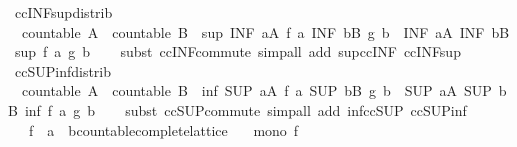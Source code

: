 \begin{isabellebody}
\endisatagproof
{\isafoldproof}%
%
\isadelimproof
\isanewline
%
\endisadelimproof
\isanewline
{}\isamarkupfalse%
\ ccINF{\isacharunderscore}sup{\isacharunderscore}distrib{}{\isacharcolon}\isanewline
\ \ {\isachardoublequoteopen}countable\ A\ {\isasymLongrightarrow}\ countable\ B\ {\isasymLongrightarrow}\ sup\ {\isacharparenleft}INF\ a{\isasymin}A{\isachardot}\ f\ a{\isacharparenright}\ {\isacharparenleft}INF\ b{\isasymin}B{\isachardot}\ g\ b{\isacharparenright}\ {\isacharequal}\ {\isacharparenleft}INF\ a{\isasymin}A{\isachardot}\ INF\ b{\isasymin}B{\isachardot}\ sup\ {\isacharparenleft}f\ a{\isacharparenright}\ {\isacharparenleft}g\ b{\isacharparenright}{\isacharparenright}{\isachardoublequoteclose}\isanewline
%
\isadelimproof
\ \ %
\endisadelimproof
%
\isatagproof
{}\isamarkupfalse%
\ {\isacharparenleft}subst\ ccINF{\isacharunderscore}commute{\isacharparenright}\ {\isacharparenleft}simp{\isacharunderscore}all\ add{\isacharcolon}\ sup{\isacharunderscore}ccINF\ ccINF{\isacharunderscore}sup{\isacharparenright}%
\endisatagproof
{\isafoldproof}%
%
\isadelimproof
\isanewline
%
\endisadelimproof
\isanewline
{}\isamarkupfalse%
\ ccSUP{\isacharunderscore}inf{\isacharunderscore}distrib{}{\isacharcolon}\isanewline
\ \ {\isachardoublequoteopen}countable\ A\ {\isasymLongrightarrow}\ countable\ B\ {\isasymLongrightarrow}\ inf\ {\isacharparenleft}SUP\ a{\isasymin}A{\isachardot}\ f\ a{\isacharparenright}\ {\isacharparenleft}SUP\ b{\isasymin}B{\isachardot}\ g\ b{\isacharparenright}\ {\isacharequal}\ {\isacharparenleft}SUP\ a{\isasymin}A{\isachardot}\ SUP\ b{\isasymin}B{\isachardot}\ inf\ {\isacharparenleft}f\ a{\isacharparenright}\ {\isacharparenleft}g\ b{\isacharparenright}{\isacharparenright}{\isachardoublequoteclose}\isanewline
%
\isadelimproof
\ \ %
\endisadelimproof
%
\isatagproof
{}\isamarkupfalse%
\ {\isacharparenleft}subst\ ccSUP{\isacharunderscore}commute{\isacharparenright}\ {\isacharparenleft}simp{\isacharunderscore}all\ add{\isacharcolon}\ inf{\isacharunderscore}ccSUP\ ccSUP{\isacharunderscore}inf{\isacharparenright}%
\endisatagproof
{\isafoldproof}%
%
\isadelimproof
\isanewline
%
\endisadelimproof
\isanewline
{}\isamarkupfalse%
\isanewline
\ \ \ f\ {\isacharcolon}{\isacharcolon}\ {\isachardoublequoteopen}{\isacharprime}a\ {\isasymRightarrow}\ {\isacharprime}b{\isacharcolon}{\isacharcolon}countable{\isacharunderscore}complete{\isacharunderscore}lattice{\isachardoublequoteclose}\isanewline
\ \ \ {\isachardoublequoteopen}mono\ f{\isachardoublequoteclose}\isanewline

\end{isabellebody}
